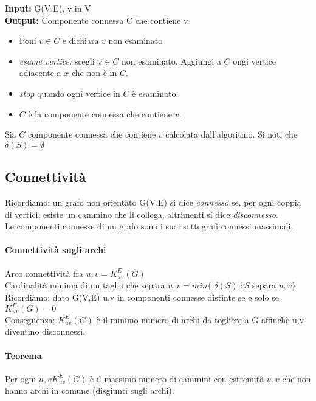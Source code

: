 \textbf{Input: }G(V,E), v in V \\
\textbf{Output:} Componente connessa C che contiene v \\
\begin{itemize}
\item Poni $v \in C$ e dichiara $v$ non esaminato
\item \emph{esame vertice:} scegli $x \in C$ non esaminato. Aggiungi a $C$ ongi vertice adiacente a $x$ che non è in $C$.
\item \emph{stop} quando ogni vertice in $C$ è esaminato.
\item $C$ è la componente connessa che contiene $v$.
\end{itemize}
Sia $C$ componente connessa che contiene $v$ calcolata dall'algoritmo. Si noti che \(\delta(S) = \emptyset \)

\subsection{Connettività}
Ricordiamo: un grafo non orientato G(V,E) si dice \emph{connesso} se, per ogni coppia di vertici, esiste
un cammino che li collega, altrimenti si dice \emph{disconnesso}. \\
Le componenti connesse di un grafo sono i suoi sottografi connessi massimali. \\

\paragraph{Connettività sugli archi} Arco connettività fra \( u,v = K^E_{uv} (G)\) \\
Cardinalità minima di un taglio che separa \( u,v = min \{ \mid \delta(S) \mid : S \) separa \( u,v \}\) \\
Ricordiamo: dato G(V,E) u,v in componenti connesse distinte se e solo se \(K^E_{uv} (G) =0\) \\
Conseguenza: \(K^E_{uv} (G)\) è il minimo numero di archi da togliere a G affinchè u,v diventino disconnessi. \\

\paragraph{Teorema} Per ogni \( u,v K^E_{uv} (G)\) è il massimo numero di cammini con estremità $u,v$ che non hanno archi in comune (disgiunti sugli archi). \\

